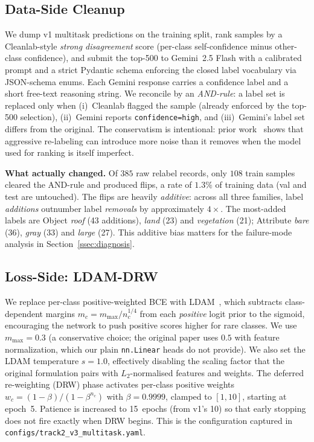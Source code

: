 \documentclass[journal]{IEEEtran}
\begin{document}
\subsection{Data-Side Cleanup}\label{ssec:cleanup}

We dump v1 multitask predictions on the training split, rank samples by a Cleanlab-style \emph{strong disagreement} score (per-class self-confidence minus other-class confidence), and submit the top-500 to Gemini~2.5 Flash with a calibrated prompt and a strict Pydantic schema enforcing the closed label vocabulary via JSON-schema enums. Each Gemini response carries a confidence label and a short free-text reasoning string. We reconcile by an \emph{AND-rule}: a label set is replaced only when (i)~Cleanlab flagged the sample (already enforced by the top-500 selection), (ii)~Gemini reports \texttt{confidence=high}, and (iii)~Gemini's label set differs from the original. The conservatism is intentional: prior work~\cite{northcutt2021pervasive} shows that aggressive re-labeling can introduce more noise than it removes when the model used for ranking is itself imperfect.

\textbf{What actually changed.} Of $385$ raw relabel records, only $108$ train samples cleared the AND-rule and produced flips, a rate of $1.3\%$ of training data (val and test are untouched). The flips are heavily \emph{additive}: across all three families, label \emph{additions} outnumber label \emph{removals} by approximately $4\times$. The most-added labels are Object \emph{roof} (43 additions), \emph{land} (23) and \emph{vegetation} (21); Attribute \emph{bare} (36), \emph{gray} (33) and \emph{large} (27). This additive bias matters for the failure-mode analysis in Section~\ref{ssec:diagnosis}.

\subsection{Loss-Side: LDAM-DRW}\label{ssec:ldam}

We replace per-class positive-weighted BCE with LDAM~\cite{cao2019ldam}, which subtracts class-dependent margins $m_c = m_{\max} / n_c^{1/4}$ from each \emph{positive} logit prior to the sigmoid, encouraging the network to push positive scores higher for rare classes. We use $m_{\max} = 0.3$ (a conservative choice; the original paper uses $0.5$ with feature normalization, which our plain \texttt{nn.Linear} heads do not provide). We also set the LDAM temperature $s = 1.0$, effectively disabling the scaling factor that the original formulation pairs with $L_2$-normalised features and weights. The deferred re-weighting (DRW) phase activates per-class positive weights $w_c = (1-\beta) / (1-\beta^{n_c})$ with $\beta = 0.9999$, clamped to $[1,10]$, starting at epoch~5. Patience is increased to 15~epochs (from v1's 10) so that early stopping does not fire exactly when DRW begins. This is the configuration captured in \texttt{configs/track2\_v3\_multitask.yaml}.
\end{document}
